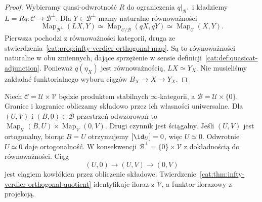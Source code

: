 \begin{proof}
Wybieramy quasi-odwrotność $R$ do ograniczenia $q|_{\mathcal B^\perp}$ i kładziemy $L=Rq:\mathcal C\to\mathcal B^\perp$. Dla $Y\in\mathcal B^\perp$ mamy naturalne równoważności
\[
 \operatorname{Map}_{\mathcal B^\perp}(LX,Y)
 \simeq\operatorname{Map}_{\mathcal C/\mathcal B}(qX,qY)
 \simeq\operatorname{Map}_{\mathcal C}(X,Y).
\]
Pierwsza pochodzi z równoważności kategorii, druga ze stwierdzenia~\ref{cat:prop:infty-verdier-orthogonal-map}. Są to równoważności naturalne w obu zmiennych, dające sprzężenie w sensie definicji~\ref{cat:def:quasicat-adjunction}. Ponieważ $q(\eta_X)$ jest równoważnością, $LX\simeq Y_X$. Nie musieliśmy zakładać funktorialnego wyboru ciągów $B_X\to X\to Y_X$.
\end{proof}

\begin{przyklad}\label{cat:ex:infty-verdier-product}
Niech $\mathcal C=\mathcal U\times\mathcal V$ będzie produktem stabilnych $\infty$-kategorii, a $\mathcal B=\mathcal U\times\{0\}$. Granice i kogranice obliczamy składowo przez ich własności uniwersalne. Dla $(U,V)$ i $(B,0)\in\mathcal B$ przestrzeń odwzorowań to $\operatorname{Map}_{\mathcal U}(B,U)\times\operatorname{Map}_{\mathcal V}(0,V)$. Drugi czynnik jest ściągalny. Jeśli $(U,V)$ jest ortogonalny, biorąc $B=U$ otrzymujemy $[\id_U]=0$, więc $U\simeq0$. Odwrotnie $U\simeq0$ daje ortogonalność. W konsekwencji $\mathcal B^\perp=\{0\}\times\mathcal V$ z dokładnością do równoważności. Ciąg
\[
 (U,0)\longrightarrow(U,V)\longrightarrow(0,V)
\]
jest ciągiem kowłókien przez obliczenie składowe. Twierdzenie~\ref{cat:thm:infty-verdier-orthogonal-quotient} identyfikuje iloraz z $\mathcal V$, a funktor ilorazowy z projekcją.
\end{przyklad}

